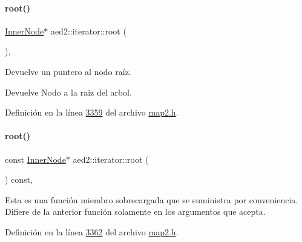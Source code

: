 \paragraph{\texorpdfstring{root()}{root()}\hspace{0.1cm}{\footnotesize\ttfamily [1/2]}}
{\footnotesize\ttfamily \hyperlink{structaed2_1_1iterator_1_1InnerNode}{Inner\+Node}$\ast$ aed2\+::iterator\+::root (\begin{DoxyParamCaption}{ }\end{DoxyParamCaption})\hspace{0.3cm}{\ttfamily [inline]}, {\ttfamily [private]}}



Devuelve un puntero al nodo raíz. 

\begin{DoxyReturn}{Devuelve}
Nodo a la raiz del arbol. 
\end{DoxyReturn}


Definición en la línea \hyperlink{map2_8h_source_l03359}{3359} del archivo \hyperlink{map2_8h_source}{map2.\+h}.

\mbox{\label{classaed2_1_1iterator_af8ec6345324ba983e64f210ccbc90b2c_af8ec6345324ba983e64f210ccbc90b2c}} 
\paragraph{\texorpdfstring{root()}{root()}\hspace{0.1cm}{\footnotesize\ttfamily [2/2]}}
{\footnotesize\ttfamily const \hyperlink{structaed2_1_1iterator_1_1InnerNode}{Inner\+Node}$\ast$ aed2\+::iterator\+::root (\begin{DoxyParamCaption}{ }\end{DoxyParamCaption}) const\hspace{0.3cm}{\ttfamily [inline]}, {\ttfamily [private]}}

Esta es una función miembro sobrecargada que se suministra por conveniencia. Difiere de la anterior función solamente en los argumentos que acepta. 

Definición en la línea \hyperlink{map2_8h_source_l03362}{3362} del archivo \hyperlink{map2_8h_source}{map2.\+h}.

\mbox{\label{classaed2_1_1iterator_ada09b8f1fe307abe0b9e01401e2172e1_ada09b8f1fe307abe0b9e01401e2172e1}} 
